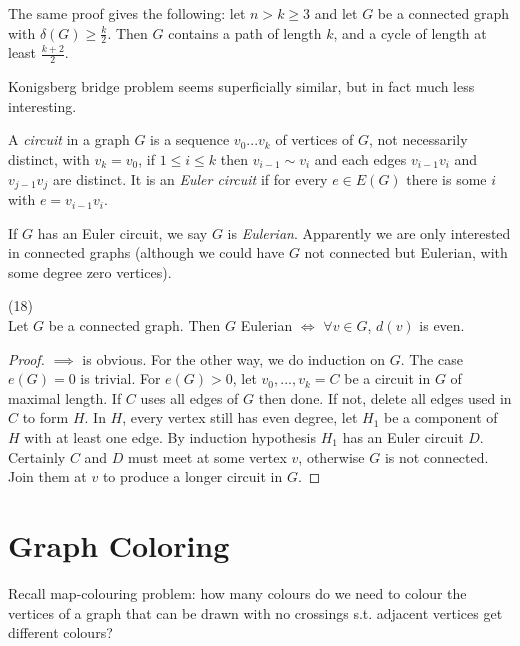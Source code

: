 \documentclass[a4paper]{article}
\begin{document}
\begin{rem}
The same proof gives the following: let $n > k \geq 3$ and let $G$ be a connected graph with $\delta(G) \geq \frac{k}{2}$. Then $G$ contains a path of length $k$, and a cycle of length at least $\frac{k+2}{2}$.
\end{rem}

Konigsberg bridge problem seems superficially similar, but in fact much less interesting.

\begin{defi}
A \emph{circuit} in a graph $G$ is a sequence $v_0 ... v_k$ of vertices of $G$, not necessarily distinct, with $v_k = v_0$, if $1 \leq i \leq k$ then $v_{i-1} \sim v_i$ and each edges $v_{i-1}v_i$ and $v_{j-1} v_j$ are distinct. It is an \emph{Euler circuit} if for every $e \in E(G)$ there is some $i$ with $e = v_{i-1} v_i$.
\end{defi}

If $G$ has an Euler circuit, we say $G$ is \emph{Eulerian}. Apparently we are only interested in connected graphs (although we could have $G$ not connected but Eulerian, with some degree zero vertices).

\begin{prop} (18)\\
Let $G$ be a connected graph. Then $G$ Eulerian $\iff$ $\forall v \in G$, $d(v)$ is even.
\begin{proof}
$\implies$ is obvious. For the other way, we do induction on $G$. The case $e(G) = 0$ is trivial. For $e(G)>0$, let $v_0,...,v_k = C$ be a circuit in $G$ of maximal length. If $C$ uses all edges of $G$ then done. If not, delete all edges used in $C$ to form $H$. In $H$, every vertex still has even degree, let $H_1$ be a component of $H$ with at least one edge. By induction hypothesis $H_1$ has an Euler circuit $D$. Certainly $C$ and $D$ must meet at some vertex $v$, otherwise $G$ is not connected. Join them at $v$ to produce a longer circuit in $G$.
\end{proof}
\end{prop}

\newpage

\section{Graph Coloring}

Recall map-colouring problem: how many colours do we need to colour the vertices of a graph that can be drawn with no crossings s.t. adjacent vertices get different colours?
\end{document}
